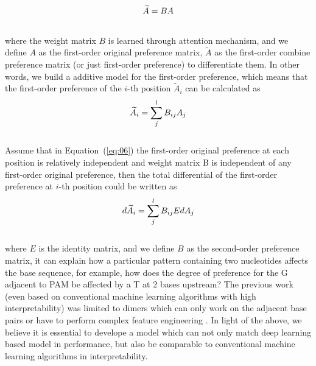 \documentclass{bioinfo}
\begin{document}
\begin{equation}
\widetilde{A}=BA\label{eq:05}\vspace*{-10pt}
\end{equation}\\
 where the weight matrix $B$ is learned through attention mechanism, and we define $A$ as the first-order original preference matrix, 
 $\widetilde{A}$ as the first-order combine preference matrix (or just first-order preference) to differentiate them.
 In other words, we build a additive model for the first-order preference, 
 which means that the first-order preference of the $i$-th position $\widetilde{A}_i$ can be calculated as
\begin{equation}
\widetilde{A}_i=\sum_j^lB_{ij}A_j\label{eq:06}\vspace*{-10pt}
\end{equation}\\
 Assume that in Equation~(\ref{eq:06}) the first-order original preference at each position is relatively independent and weight matrix B is independent of any first-order original preference, 
 then the total differential of the first-order preference at $i$-th position could be written as
\begin{equation}
d\widetilde{A}_i=\sum_j^lB_{ij}EdA_j\label{eq:07}\vspace*{-10pt}
\end{equation}\\
 where $E$ is the identity matrix, and we define $B$ as the second-order preference matrix, 
 it can explain how a particular pattern containing two nucleotides affects the base sequence, 
 for example, how does the degree of preference for the G adjacent to PAM be affected by a T at 2 bases upstream?
 The previous work (even based on conventional machine learning algorithms with high interpretability) 
 was limited to dimers which can only work on the adjacent base pairs \citep{Liu2019} 
 or have to perform complex feature engineering \citep{MuhammadRafid2020}.
 In light of the above, we believe it is essential to develope a model which can not only match deep learning based model in performance, 
 but also be comparable to conventional machine learning algorithms in interpretability.
\end{document}
